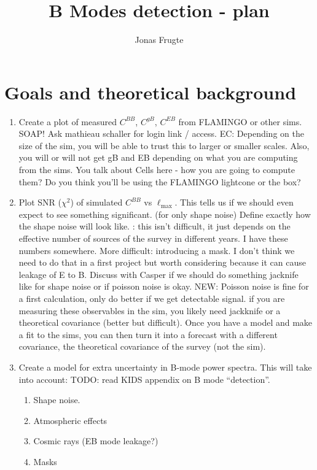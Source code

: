 \documentclass{article}
\title{B Modes detection - plan}
\author{Jonas Frugte}
\begin{document}
\maketitle

\section*{Goals and theoretical background}
\begin{enumerate}
    \item Create a plot of measured $C^{BB}$, $C^{gB}$, $C^{EB}$ from FLAMINGO or other sims. SOAP! Ask mathieau schaller for login link / access. {\color{magenta} EC: Depending on the size of the sim, you will be able to trust this to larger or smaller scales. Also, you will or will not get gB and EB depending on what you are computing from the sims. You talk about Cells here - how you are going to compute them? Do you think you'll be using the FLAMINGO lightcone or the box?}
    
    \item Plot SNR ($\chi^2$) of simulated $C^{BB}$ vs $\ell_{\text{max}}$. This tells us if we should even expect to see something significant. (for only shape noise) Define exactly how the shape noise will look like. {\color{magenta}: this isn't difficult, it just depends on the effective number of sources of the survey in different years. I have these numbers somewhere. More difficult: introducing a mask. I don't think we need to do that in a first project but worth considering because it can cause leakage of E to B.} Discuss with Casper if we should do something jacknife like for shape noise or if poisson noise is okay. NEW: Poisson noise is fine for a first calculation, only do better if we get detectable signal.{\color{magenta} if you are measuring these observables in the sim, you likely need jackknife or a theoretical covariance (better but difficult). Once you have a model and make a fit to the sims, you can then turn it into a forecast with a different covariance, the theoretical covariance of the survey (not the sim).}
    
    \item Create a model for extra uncertainty in B-mode power spectra. This will take into account:
    {\color{gray} TODO: read KIDS appendix on B mode ``detection''.}
    \begin{enumerate}
        \item Shape noise.
        \item Atmospheric effects
        \item Cosmic rays (EB mode leakage?)
        \item Masks


\end{enumerate}
\end{enumerate}
\end{document}
